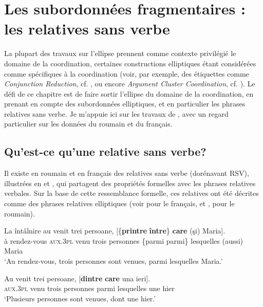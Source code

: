 \chapter{Les subordonnées fragmentaires : les relatives sans verbe} \label{ch3}


La plupart des travaux sur l’ellipse prennent comme contexte privilégié le domaine de la coordination, certaines constructions elliptiques étant considérées comme spécifiques à la coordination (voir, par exemple, des étiquettes comme \textit{Conjunction Reduction}, cf. \citealt{Jackendoff1971}, ou encore \textit{Argument Cluster Coordination}, cf. \citealt{Steedman2000}). Le défi de ce chapitre est de faire sortir l’ellipse du domaine de la coordination, en prenant en compte des subordonnées elliptiques, et en particulier les phrases relatives sans verbe. Je m’appuie ici sur les travaux de \citet{BilbiieEtAl2009,BilbiieEtAl2010}, avec un regard particulier sur les données du roumain et du français.


\section{Qu’est-ce qu’une relative sans verbe?}\label{ch3:sect3.1}

Il existe en roumain et en français des relatives sans verbe (dorénavant RSV), illustrées en  et , qui partagent des propriétés formelles avec les phrases relatives verbales. Sur la base de cette ressemblance formelle, ces relatives ont été décrites comme des phrases relatives elliptiques (voir \citealt{Grevisse1993} pour le français, et \citealt{Gheorghe2004}, \citealt{Gheorghe2005} pour le roumain).  

\ea \label{ch3:ex1}
\ea
\gll La  întâlnire  au  venit  trei  persoane,  [\{\textbf{printre}  {\textbar} \textbf{între}\}  \textbf{care} (şi)  Maria].\\
à  rendez-vous \textsc{aux.3pl} venu  trois  personnes  \{parmi  {\textbar}  parmi\}  lesquelles (aussi)  Maria\\ 
\glt ‘Au rendez-vous, trois personnes sont venues, parmi lesquelles Maria.’

\ex
\gll Au  venit  trei  persoane,  [\textbf{dintre} \textbf{care}  una  ieri].\\
\textsc{aux.3pl} venu  trois  personnes  parmi  lesquelles  une  hier\\
\glt ‘Plusieurs personnes sont venues, dont une hier.’
\z
\z


